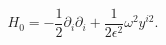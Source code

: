 \begin{equation}
H_0 = -\frac{1}{2}\partial_i\partial_i + \frac{1}{2\epsilon^2}\omega^2y^{i2}.
\label{2.14a}
\end{equation}

